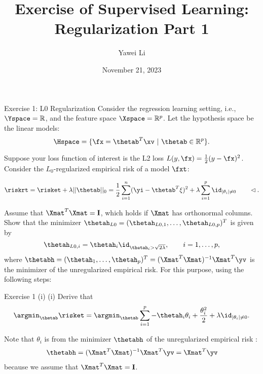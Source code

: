 \documentclass[aspectratio=169]{beamer}
\title[]{\textbf{Exercise of Supervised Learning: \\ Regularization Part 1}}
\author{Yawei Li}
\institute[LMU]
{
\\
  \texttt{yawei.li@stat.uni-muenchen.de}
}
\date{November 21, 2023}
\newcommand{\thetahi}{\thetah_i}
\newcommand{\thetai}{\theta_i}
\newcommand{\thetainnz}{\id_{|\theta_i| \neq 0}}
\newcommand{\Imat}{\mathbf{I}}
\newcommand{\sumip}{\sum_{i=1}^p}
\begin{document}
\begin{frame}
\titlepage

\end{frame}



\begin{frame}{Exercise 1: L0 Regularization}
	\small
	Consider the regression learning setting, i.e., $\Yspace = \mathbb{R}$, and the feature space $\Xspace = \mathbb{R}^p$. Let the hypothesis space be the linear models: $$\Hspace = \{ \fx = \thetab^T \xv \ | \ \thetab \in \mathbb{R}^p \}.$$
	
	Suppose your loss function of interest is the L2 loss $L(y, \fx) = \frac{1}{2} (y - \fx)^2$. Consider the $L_0$-regularized empirical risk of a model $\fxt$: 
	
	$$
		\riskrt = \risket + \lambda ||\thetab ||_0 = \frac{1}{2} \sum_{i=1}^n (\yi - \thetab^T \xi )^2 + \lambda \sum_{i=1}^p \thetainnz \qquad \lhd.
	$$
	
	Assume that $\Xmat^T \Xmat = \Imat$, which holds if $\Xmat$ has orthonormal columns. Show that the minimizer $\thetah_{L0} = (\thetah_{L0, 1}, \ldots, \thetah_{L0, p})^T$ is given by 
	$$
		\thetah_{L0, i} = \thetahi \id_{\thetahi > \sqrt{2 \lambda}}, \qquad i = 1, \ldots, p,
	$$
	where $\thetabh = (\thetah_1, \ldots, \thetah_p)^T = (\Xmat^T \Xmat)^{-1} \Xmat^T \yv$ is the minimizer of the unregularized empirical risk. For this purpose, using the following steps:
	
\end{frame}

\begin{frame}{Exercise 1 (i)}
	(i) Derive that 
	\begin{align*}
		\argmin_{\thetab} \risket = \argmin_{\thetab} \sumip - \thetahi \thetai + \frac{\thetai^2}{2} + \lambda \thetainnz.
	\end{align*}
	
	Note that $\thetai$ is from the minimizer $\thetabh$ of the unregularized empirical risk :
	\begin{align*}
		\thetabh = (\Xmat^T \Xmat)^{-1} \Xmat^T \yv = \Xmat^T \yv
	\end{align*}
	because we assume that $\Xmat^T \Xmat = \Imat$.
\end{frame}
\end{document}
